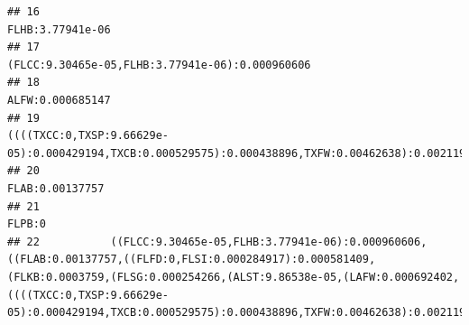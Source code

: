 \documentclass[]{article}
\begin{document}
\begin{verbatim}
## 16                                                                                                                                                                                                                                                                                                                                                                                                                  FLHB:3.77941e-06
## 17                                                                                                                                                                                                                                                                                                                                                                                   (FLCC:9.30465e-05,FLHB:3.77941e-06):0.000960606
## 18                                                                                                                                                                                                                                                                                                                                                                                                                  ALFW:0.000685147
## 19                                                                                                                                                                                                                                                                                                   ((((TXCC:0,TXSP:9.66629e-05):0.000429194,TXCB:0.000529575):0.000438896,TXFW:0.00462638):0.0021191,ALFW:0.000685147):0.000263869
## 20                                                                                                                                                                                                                                                                                                                                                                                                                   FLAB:0.00137757
## 21                                                                                                                                                                                                                                                                                                                                                                                                                            FLPB:0
## 22           ((FLCC:9.30465e-05,FLHB:3.77941e-06):0.000960606,((FLAB:0.00137757,((FLFD:0,FLSI:0.000284917):0.000581409,(FLKB:0.0003759,(FLSG:0.000254266,(ALST:9.86538e-05,(LAFW:0.000692402,((((TXCC:0,TXSP:9.66629e-05):0.000429194,TXCB:0.000529575):0.000438896,TXFW:0.00462638):0.0021191,ALFW:0.000685147):0.000263869):0.00044979):0.00272304):0.000116498):0.000251601):0.00159115):0.0103898,FLLG:0.0165787):0.000403984):0

\end{verbatim}
\end{document}
